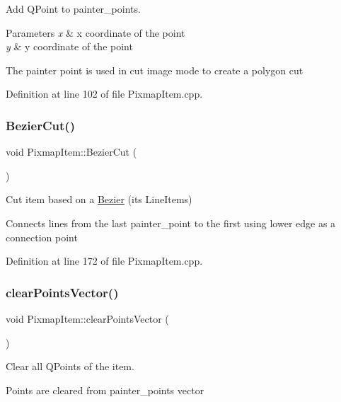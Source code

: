 Add Q\+Point to painter\+\_\+points. 


\begin{DoxyParams}{Parameters}
{\em x} & x coordinate of the point \\
\hline
{\em y} & y coordinate of the point\\
\hline
\end{DoxyParams}
The painter point is used in cut image mode to create a polygon cut 

Definition at line 102 of file Pixmap\+Item.\+cpp.

\mbox{\label{classPixmapItem_a660c7d73c4f915e6673a3b602affb568}} 
\subsubsection{\texorpdfstring{Bezier\+Cut()}{BezierCut()}}
{\footnotesize\ttfamily void Pixmap\+Item\+::\+Bezier\+Cut (\begin{DoxyParamCaption}{ }\end{DoxyParamCaption})}



Cut item based on a \mbox{\hyperlink{classBezier}{Bezier}} (its Line\+Items) 

Connects lines from the last painter\+\_\+point to the first using lower edge as a connection point 

Definition at line 172 of file Pixmap\+Item.\+cpp.

\mbox{\label{classPixmapItem_a54810877049ab858d569f83065720a18}} 
\subsubsection{\texorpdfstring{clear\+Points\+Vector()}{clearPointsVector()}}
{\footnotesize\ttfamily void Pixmap\+Item\+::clear\+Points\+Vector (\begin{DoxyParamCaption}{ }\end{DoxyParamCaption})}



Clear all Q\+Points of the item. 

Points are cleared from painter\+\_\+points vector 

